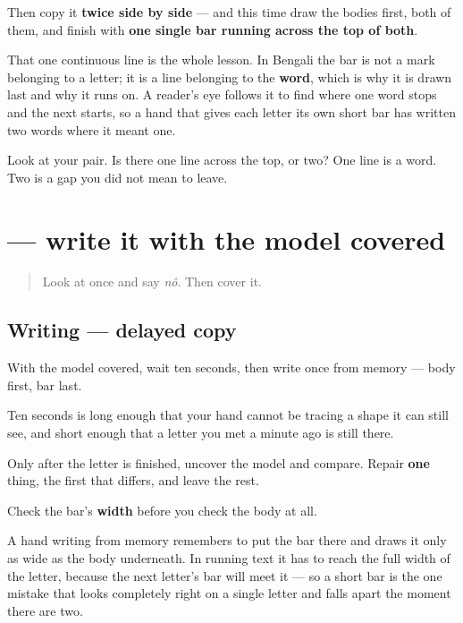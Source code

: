 Then copy it \textbf{twice side by side} — and this time draw the bodies first, both of them, and finish with \textbf{one single bar running across the top of both}.

That one continuous line is the whole lesson. In Bengali the bar is not a mark belonging to a letter; it is a line belonging to the \textbf{word}, which is why it is drawn last and why it runs on. A reader's eye follows it to find where one word stops and the next starts, so a hand that gives each letter its own short bar has written two words where it meant one.

\begin{tcolorbox}[breakable,colback=teal!4,colframe=teal!35!black,title={Before you move on}]
Look at your pair. Is there one line across the top, or two? One line is a word. Two is a gap you did not mean to leave.
\end{tcolorbox}
\section[\texorpdfstring{\bn{ন} (nô)}{ন (nô)}]{ — write it with the model covered}

\label{lesson:BN-W01-na-delayed-copy}



\begin{quote}
Look at \textbf{} once and say \emph{nô}. Then cover it.
\end{quote}

\subsection*{Writing — delayed copy}

With the model covered, wait ten seconds, then write \textbf{} once from memory — body first, bar last.

Ten seconds is long enough that your hand cannot be tracing a shape it can still see, and short enough that a letter you met a minute ago is still there.

Only after the letter is finished, uncover the model and compare. Repair \textbf{one} thing, the first that differs, and leave the rest.

\begin{tcolorbox}[breakable,colback=teal!4,colframe=teal!35!black,title={Before you move on}]
Check the bar's \textbf{width} before you check the body at all.

A hand writing from memory remembers to put the bar there and draws it only as wide as the body underneath. In running text it has to reach the full width of the letter, because the next letter's bar will meet it — so a short bar is the one mistake that looks completely right on a single letter and falls apart the moment there are two.
\end{tcolorbox}
